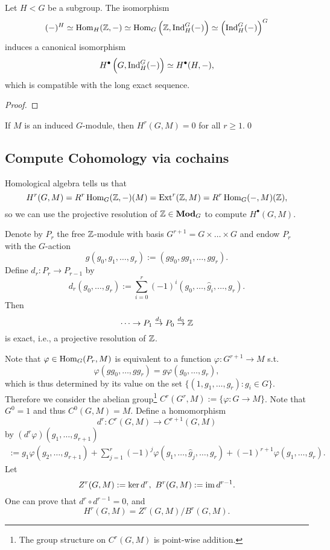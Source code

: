 \begin{proposition}\label{Shapiro's lemma}
Let $H < G$ be a subgroup.
The isomorphism\[(-)^H \simeq \operatorname{Hom}_H(\mathbb{Z}, -) \simeq \operatorname{Hom}_G\left(\mathbb{Z}, \operatorname{Ind}^G_H(-)\right)\simeq \left( \operatorname{Ind}_H^G(-) \right)^G\]induces a canonical isomorphism \[H^\bullet \left(G, \operatorname{Ind}^G_H (-)\right)\simeq H^\bullet (H, -),\]
which is compatible with the long exact sequence.
\end{proposition}
\begin{proof}
    
\end{proof}

\begin{corollary}\label{induced modules have trivial cohomology}
    If $M$ is an induced $G$-module, then $H^r(G, M) = 0$ for all $r\ge 1$.\qed
\end{corollary}


\subsection{Compute Cohomology via cochains}

Homological algebra tells us that \[H^r(G, M) = R^r\operatorname{Hom}_G(\mathbb{Z}, -)(M) = \operatorname{Ext}^r(\mathbb{Z}, M) = R^r\operatorname{Hom}_G(-, M)(\mathbb{Z}),\]
so we can use the projective resolution of $\mathbb{Z}\in\mathbf{Mod}_G$ to compute $H^\bullet(G, M)$.

Denote by $P_r$ the free $\mathbb{Z}$-module with basis $G^{r+1} = G\times\dots\times G$ and endow $P_r$ with the $G$-action
\[g(g_0, g_1,\dots, g_r) := (gg_0, gg_1, \dots, gg_r).\]
Define $d_r : P_r\to P_{r-1}$ by \[d_r(g_0, \dots, g_r) := \sum_{i=0}^r(-1)^i(g_0,\dots, \hat{g}_i, \dots, g_r).\]
Then \[\dots\to P_1\stackrel{d_1}{\to} P_0\stackrel{d_0}{\to} \mathbb{Z}\] is exact, i.e., a projective resolution of $\mathbb{Z}$.

Note that $\varphi\in\operatorname{Hom}_G(P_r, M)$ is equivalent to a function $\varphi : G^{r+1}\to M$ s.t. \[\varphi(gg_0, \dots, gg_r) = g\varphi(g_0, \dots, g_r),\]
which is thus determined by its value on the set $\{(1, g_1, \dots, g_r) : g_i\in G\}$. Therefore we consider the abelian group\footnote{The group structure on $C^r(G, M)$ is point-wise addition.} $C^r(G^r, M) := \{\varphi : G \to M\}$. Note that $G^0 = 1$ and thus $C^0(G, M) = M$.
Define a homomorphism \[d^r : C^r(G, M) \to C^{r+1}(G, M)\] by $(d^r\varphi)(g_1, \dots, g_{r+1})$\begin{align}
    := g_1\varphi(g_2, \dots, g_{r+1}) + \sum_{j=1}^r(-1)^j\varphi(g_1, \dots, \hat{g}_j, \dots, g_r) + (-1)^{r+1}\varphi(g_1, \dots, g_r).
\end{align}
Let \[Z^r(G, M) := \ker d^r,\ B^r(G, M) := \operatorname{im} d^{r-1}.\]
One can prove that $d^r\circ d^{r-1} = 0$, and \[H^r(G, M) = Z^r(G, M)/B^r(G, M).\]

